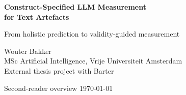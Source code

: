 \begin{frame}[plain]
    \vspace{1.2cm}

    {\Large\bfseries
    Construct-Specified LLM Measurement\\
    for Text Artefacts
    }

    \vspace{0.35cm}

    {\normalsize
    From holistic prediction to validity-guided measurement
    }

    \vfill

    {\small
    Wouter Bakker\\
    MSc Artificial Intelligence, Vrije Universiteit Amsterdam\\
    External thesis project with Barter
    }

    \vspace{0.35cm}

    {\scriptsize
    Second-reader overview \hfill \today
    }
\end{frame}